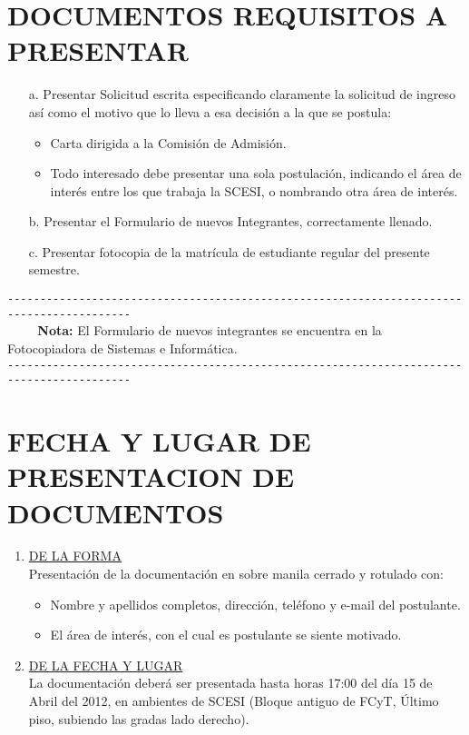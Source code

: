 \documentclass[11pt,letterpaper]{report}
\begin{document}
\section*{\bf \normalsize DOCUMENTOS REQUISITOS A PRESENTAR}
\begin{itemize}
\item[a.] Presentar Solicitud escrita especificando claramente la solicitud de ingreso así como el motivo que lo lleva a esa decisión a la que se postula:
\begin{itemize}
\item Carta dirigida a la Comisión de Admisión.
\item Todo interesado debe presentar una sola postulación, indicando el área de interés entre los que  trabaja la SCESI, o nombrando otra área de interés.
\end{itemize}
\item[b.] Presentar el Formulario de nuevos Integrantes, correctamente llenado.
\item[c.] Presentar fotocopia de la matrícula de estudiante regular del presente semestre.
\end{itemize}
\verb+-----------------------------------------------------------------------------------------+\\
\verb+    + {\bf Nota:} El Formulario de nuevos integrantes se encuentra en la Fotocopiadora de Sistemas e Informática.\\
\verb+-----------------------------------------------------------------------------------------+

\section*{\bf \normalsize FECHA Y LUGAR DE PRESENTACION DE DOCUMENTOS}
\begin{enumerate}
\item \underline{DE LA FORMA}\\
Presentación de la documentación en sobre manila cerrado y rotulado con:
\begin{itemize}
	\item Nombre y apellidos completos, dirección, teléfono y e-mail del postulante.
	\item El área de interés, con el cual es postulante se siente motivado.
\end{itemize}
\item \underline{DE LA FECHA Y LUGAR}\\
La documentación deberá ser presentada hasta horas 17:00 del día 15 de Abril del 2012, en ambientes de SCESI (Bloque antiguo de FCyT, Último piso, subiendo las gradas lado derecho).
\end{enumerate}
\end{document}
